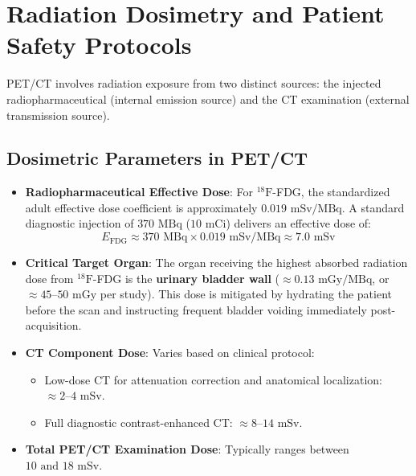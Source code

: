 \documentclass[11pt,a4paper]{article}
\begin{document}
\section{Radiation Dosimetry and Patient Safety Protocols}

PET/CT involves radiation exposure from two distinct sources: the injected radiopharmaceutical (internal emission source) and the CT examination (external transmission source).

\subsection{Dosimetric Parameters in PET/CT}
\begin{itemize}[leftmargin=*]
    \item \textbf{Radiopharmaceutical Effective Dose}: For $^{18}\text{F}$-FDG, the standardized adult effective dose coefficient is approximately $0.019\text{ mSv/MBq}$. A standard diagnostic injection of $370\text{ MBq}$ ($10\text{ mCi}$) delivers an effective dose of:
    \begin{equation}
        E_{\text{FDG}} \approx 370\text{ MBq} \times 0.019\text{ mSv/MBq} \approx 7.0\text{ mSv}
    \end{equation}
    \item \textbf{Critical Target Organ}: The organ receiving the highest absorbed radiation dose from $^{18}\text{F}$-FDG is the \textbf{urinary bladder wall} ($\approx 0.13\text{ mGy/MBq}$, or $\approx 45\text{--}50\text{ mGy}$ per study). This dose is mitigated by hydrating the patient before the scan and instructing frequent bladder voiding immediately post-acquisition.
    \item \textbf{CT Component Dose}: Varies based on clinical protocol:
    \begin{itemize}
        \item Low-dose CT for attenuation correction and anatomical localization: $\approx 2\text{--}4\text{ mSv}$.
        \item Full diagnostic contrast-enhanced CT: $\approx 8\text{--}14\text{ mSv}$.
    \end{itemize}
    \item \textbf{Total PET/CT Examination Dose}: Typically ranges between \textbf{$10\text{ and }18\text{ mSv}$}.
\end{itemize}
\end{document}

